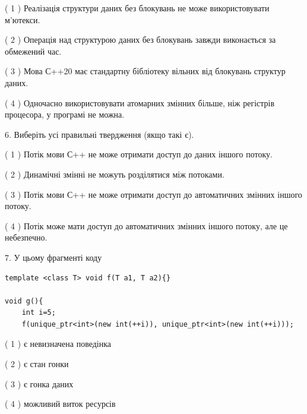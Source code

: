 \documentclass[12pt, ukrainian]{article}
\begin{document}
\begin {large}
{( 1 ) Реалізація структури даних без блокувань не може використовувати м’ютекси.%

( 2 ) Операція над структурою даних без блокувань завжди виконається за обмежений час.%

( 3 ) Мова С++20 має стандартну бібліотеку вільних від блокувань структур даних.%

( 4 ) Одночасно використовувати атомарних змінних більше, ніж регістрів процесора, у програмі не можна.%
\newpage



\vspace{5mm}
6. Виберіть усі правильні твердження (якщо такі є).\par
\vspace{2mm}

( 1 ) Потік мови С++ не може отримати доступ до даних іншого потоку.%

( 2 ) Динамічні змінні не можуть розділятися між потоками.%

( 3 ) Потік мови С++ не може отримати доступ до автоматичних змінних іншого потоку.%

( 4 ) Потік може мати доступ до автоматичних змінних іншого потоку, але це небезпечно.%


\vspace{5mm}
7. У цьому фрагменті коду
\begin{verbatim}
template <class T> void f(T a1, T a2){}

void g(){
    int i=5;
    f(unique_ptr<int>(new int(++i)), unique_ptr<int>(new int(++i)));
\end{verbatim}

( 1 ) є невизначена поведінка%

( 2 ) є стан гонки%

( 3 ) є гонка даних%

( 4 ) можливий виток ресурсів%
}
\end {large}

\vspace{4mm}
\newpage
\end{document}

